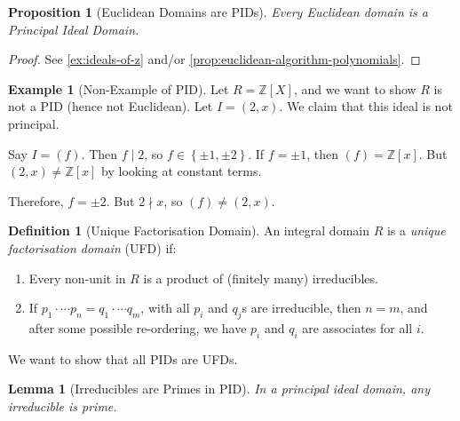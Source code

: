 \documentclass{article}
\newtheorem{lemma}[theorem]{Lemma}
\newtheorem{proposition}[theorem]{Proposition}
\theoremstyle{definition}
\newtheorem{definition}[theorem]{Definition}
\newtheorem{example}[theorem]{Example}
\theoremstyle{remark}
\newcommand{\pqty}[1]{\left(#1\right)}
\newcommand{\bqty}[1]{\left[#1\right]}
\newcommand{\Bqty}[1]{\left\{#1\right\}}
\newcommand{\divides}{\mid}
\newcommand{\notdivides}{\nmid}
\newcommand{\ZZ}{\mathbb{Z}}
\begin{document}
\begin{proposition}[Euclidean Domains are PIDs]
    \label{prop:euclidean-pid}%
    Every Euclidean domain is a Principal Ideal Domain.
\end{proposition}

\begin{proof}
    See \autoref{ex:ideals-of-z} and/or \autoref{prop:euclidean-algorithm-polynomials}.
\end{proof}

\begin{example}[Non-Example of PID]
    \label{ex:non-example-pid}%
    Let \(R = \ZZ\bqty{X}\), and we want to show \(R\) is not a PID (hence not Euclidean). Let \(I = \pqty{2, x}\). We claim that this ideal is not principal.

    Say \(I = \pqty{f}\). Then \(f \divides 2\), so \(f \in \Bqty{\pm 1, \pm 2}\). If \(f = \pm 1\), then \(\pqty{f} = \ZZ\bqty{x}\). But \(\pqty{2, x} \neq \ZZ\bqty{x}\) by looking at constant terms.

    Therefore, \(f = \pm 2\). But \(2 \notdivides x\), so \(\pqty{f} \neq \pqty{2, x}\).
\end{example}

\begin{definition}[Unique Factorisation Domain]
    \label{def:ufd}%
    An integral domain \(R\) is a \emph{unique factorisation domain} (UFD) if:
    \begin{enumerate}
        \item Every non-unit in \(R\) is a product of (finitely many) irreducibles.
        \item If \(p_1 \cdot \cdots p_n = q_1 \cdot \cdots q_m\), with all \(p_i\) and \(q_j\)s are irreducible, then \(n = m\), and after some possible re-ordering, we have \(p_i\) and \(q_i\) are associates for all \(i\).
    \end{enumerate}
\end{definition}

We want to show that all PIDs are UFDs.

\begin{lemma}[Irreducibles are Primes in PID]
    \label{lem:irreducible-primes-pid}%
    In a principal ideal domain, any irreducible is prime.
\end{lemma}
\end{document}
